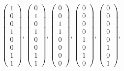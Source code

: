 \documentclass[8pt]{article}
\begin{document}
 \begin{align*} \left(\begin{array}{r}
1 \\
0 \\
0 \\
1 \\
0 \\
0 \\
1 \\
1
\end{array}\right) ,
 \left(\begin{array}{r}
0 \\
1 \\
0 \\
1 \\
0 \\
0 \\
1 \\
1
\end{array}\right) ,
 \left(\begin{array}{r}
0 \\
0 \\
1 \\
1 \\
0 \\
0 \\
0 \\
0
\end{array}\right) ,
 \left(\begin{array}{r}
0 \\
0 \\
0 \\
0 \\
1 \\
0 \\
1 \\
0
\end{array}\right) ,
 \left(\begin{array}{r}
0 \\
0 \\
0 \\
0 \\
0 \\
1 \\
0 \\
1
\end{array}\right) ,
 \end{align*}
 
\end{document}

